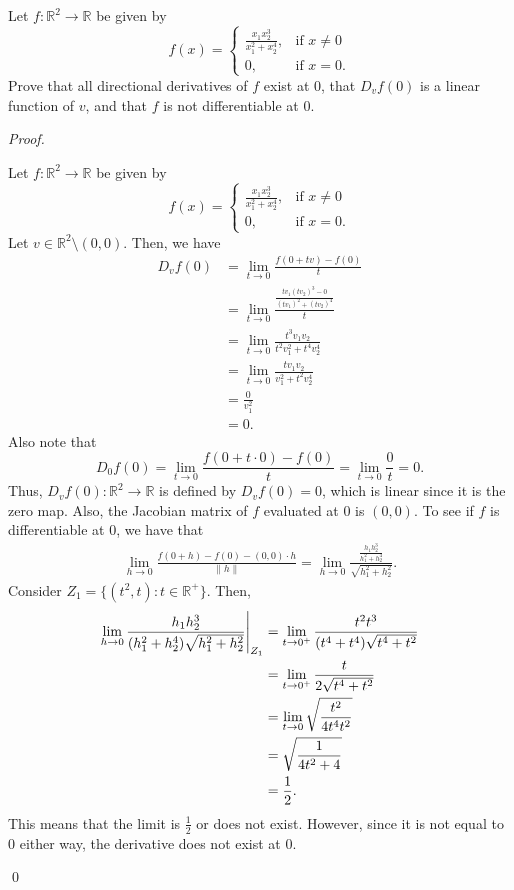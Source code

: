\documentclass[12pt]{article}
\newenvironment{problem}[2][Problem]{\begin{trivlist}
\item[\hskip \labelsep {\bfseries #1}\hskip \labelsep {\bfseries #2.}]}{\end{trivlist}}
\newenvironment{sol}
    {\emph{Proof.}
    }
    {
    \qed
    }
\newcommand\restr[2]{{%
  \left.\kern-\nulldelimiterspace %
  #1 %
  \vphantom{\big|} %
  \right|_{#2} %
  }}
\begin{document}
\begin{problem}{7}
Let $f: \mathbb{R}^2 \to \mathbb{R}$ be given by $$f(x) = \begin{cases} 
     \frac{x_1 x_2^3}{x_1^2 + x_2^4}, & \text{if } x \neq 0 \\
      0, & \text{if } x = 0. 
   \end{cases}
$$ Prove that all directional derivatives of $f$ exist at 0, that $D_vf(0)$ is a linear function of $v$, and that $f$ is not differentiable at 0.
\end{problem}
\begin{sol}
Let $f: \mathbb{R}^2 \to \mathbb{R}$ be given by $$f(x) = \begin{cases} 
     \frac{x_1 x_2^3}{x_1^2 + x_2^4}, & \text{if } x \neq 0 \\
      0, & \text{if } x = 0. 
   \end{cases}
$$ Let $v \in \mathbb{R}^2 \setminus (0, 0)$. Then, we have \begin{align*}
    D_vf(0) &= \lim_{t \to 0} \frac{f(0 + tv) - f(0)}{t} \\ &= \lim_{t \to 0} \frac{\frac{tv_1(tv_2)^3- 0}{(tv_1)^2 + (tv_2)^4}}{t} \tag*{(Definition of $f$)} \\ &= \lim_{t \to 0} \frac{t^3v_1v_2}{t^2v_1^2 + t^4v_2^4} \\ &= \lim_{t \to 0} \frac{tv_1v_2}{v_1^2 + t^2v_2^4} \\ &= \frac{0}{v_1^2} \\ &= 0.
\end{align*}
Also note that $$
    D_0f(0) = \lim_{t \to 0} \frac{f(0 + t \cdot 0) - f(0)}{t} = \lim_{t \to 0} \frac{0}{t} = 0.$$ Thus, $D_vf(0):\mathbb{R}^2 \to \mathbb{R}$ is defined by $D_vf(0) = 0$, which is linear since it is the zero map. Also, the Jacobian matrix of $f$ evaluated at $0$ is $(0, 0)$. To see if $f$ is differentiable at $0$, we have that \begin{align*}
        \lim_{h \to 0} \frac{f(0 + h) - f(0) - (0, 0)\cdot h}{\lVert h \rVert} = \lim_{h \to 0} \frac{\frac{h_1h_2^3}{h_1^2 + h_2^4}}{\sqrt{h_1^2 + h_2^2}}.
    \end{align*}
    Consider $Z_1 = \{(t^2, t) : t \in \mathbb{R}^+\}$. Then, \begin{align*}
        \lim_{h \to 0} \restr{\frac{h_1h_2^3}{(h_1^2 + h_2^4)\sqrt{h_1^2 + h_2^2}}}{Z_1} &= \lim_{t \to 0^+} \frac{t^2t^3}{(t^4 + t^4)\sqrt{t^4 + t^2}} \\ &= \lim_{t \to 0^+} \frac{t}{2\sqrt{t^4 + t^2}} \\ &= \lim_{t \to 0} \sqrt{\frac{t^2}{4t^4t^2}} \\ &= \sqrt{\frac{1}{4t^2 + 4}} \\ &= \frac{1}{2}.
    \end{align*}
    This means that the limit is $\frac{1}{2}$ or does not exist. However, since it is not equal to 0 either way, the derivative does not exist at 0.
\end{sol}
\end{document}
